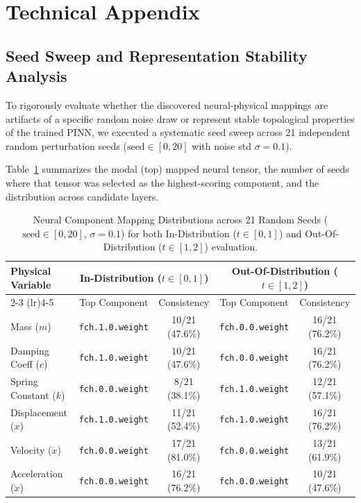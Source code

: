 \documentclass{article}
\begin{document}



\newpage
\appendix
\section{Technical Appendix}
\label{sec:appendix}

\subsection{Seed Sweep and Representation Stability Analysis}
To rigorously evaluate whether the discovered neural-physical mappings are artifacts of a specific random noise draw or represent stable topological properties of the trained PINN, we executed a systematic seed sweep across 21 independent random perturbation seeds ($\text{seed} \in [0, 20]$ with noise std $\sigma = 0.1$).

Table~\ref{tab:seed_sweep} summarizes the modal (top) mapped neural tensor, the number of seeds where that tensor was selected as the highest-scoring component, and the distribution across candidate layers.

\begin{table}[h]
\caption{Neural Component Mapping Distributions across 21 Random Seeds ($\text{seed} \in [0, 20]$, $\sigma = 0.1$) for both In-Distribution ($t\in[0,1]$) and Out-Of-Distribution ($t\in[1,2]$) evaluation.}
\label{tab:seed_sweep}
\centering
\small
\begin{tabular}{lcccc}
\toprule
Physical Variable & \multicolumn{2}{c}{In-Distribution ($t \in [0, 1]$)} & \multicolumn{2}{c}{Out-Of-Distribution ($t \in [1, 2]$)} \\
\cmidrule(lr){2-3} \cmidrule(lr){4-5}
& Top Component & Consistency & Top Component & Consistency \\
\midrule
Mass ($m$)                  & \texttt{fch.1.0.weight} & 10/21 (47.6\%) & \texttt{fch.0.0.weight} & 16/21 (76.2\%) \\
Damping Coeff ($c$)         & \texttt{fch.1.0.weight} & 10/21 (47.6\%) & \texttt{fch.0.0.weight} & 16/21 (76.2\%) \\
Spring Constant ($k$)       & \texttt{fch.0.0.weight} & 8/21 (38.1\%)  & \texttt{fch.1.0.weight} & 12/21 (57.1\%) \\
Displacement ($x$)          & \texttt{fch.1.0.weight} & 11/21 (52.4\%) & \texttt{fch.1.0.weight} & 16/21 (76.2\%) \\
Velocity ($\dot{x}$)        & \texttt{fch.0.0.weight} & 17/21 (81.0\%) & \texttt{fch.0.0.weight} & 13/21 (61.9\%) \\
Acceleration ($\ddot{x}$)   & \texttt{fch.0.0.weight} & 16/21 (76.2\%) & \texttt{fch.0.0.weight} & 10/21 (47.6\%) \\
\bottomrule
\end{tabular}
\end{table}
\end{document}
